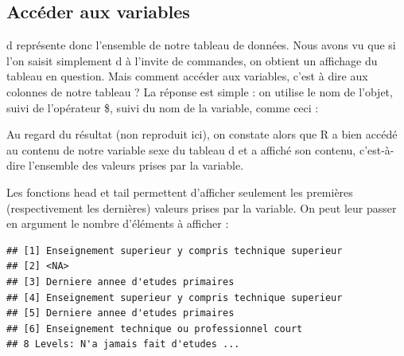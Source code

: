 \documentclass[
]{book}
\newenvironment{Shaded}{\begin{snugshade}}{\end{snugshade}}
\newcommand{\CommentTok}[1]{\textcolor[rgb]{0.56,0.35,0.01}{\textit{#1}}}
\newcommand{\DecValTok}[1]{\textcolor[rgb]{0.00,0.00,0.81}{#1}}
\newcommand{\FunctionTok}[1]{\textcolor[rgb]{0.00,0.00,0.00}{#1}}
\newcommand{\NormalTok}[1]{#1}
\newcommand{\SpecialCharTok}[1]{\textcolor[rgb]{0.00,0.00,0.00}{#1}}
\begin{document}
\hypertarget{accuxe9der-aux-variables}{%
\subsection{Accéder aux variables}\label{accuxe9der-aux-variables}}

d représente donc l'ensemble de notre tableau de données. Nous avons vu que si l'on saisit simplement d à l'invite de commandes, on obtient un affichage du tableau en question. Mais comment accéder aux variables, c'est à dire aux colonnes de notre tableau ?
La réponse est simple : on utilise le nom de l'objet, suivi de l'opérateur \$, suivi du nom de la variable, comme ceci :

\begin{Shaded}
\end{Shaded}

Au regard du résultat (non reproduit ici), on constate alors que R a bien accédé au contenu de notre variable sexe du tableau d et a affiché son contenu, c'est-à-dire l'ensemble des valeurs prises par la variable.

Les fonctions head et tail permettent d'afficher seulement les premières (respectivement les dernières) valeurs prises par la variable. On peut leur passer en argument le nombre d'éléments à afficher :

\begin{Shaded}
\end{Shaded}

\begin{verbatim}
## [1] Enseignement superieur y compris technique superieur
## [2] <NA>                                                
## [3] Derniere annee d'etudes primaires                   
## [4] Enseignement superieur y compris technique superieur
## [5] Derniere annee d'etudes primaires                   
## [6] Enseignement technique ou professionnel court       
## 8 Levels: N'a jamais fait d'etudes ...
\end{verbatim}

\begin{Shaded}
\end{Shaded}
\end{document}
